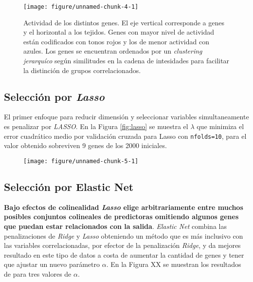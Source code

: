 \documentclass[a4paper]{article}\usepackage[]{graphicx}\usepackage[]{color}
\makeatletter
\def\maxwidth{ %
  \ifdim\Gin@nat@width>\linewidth
    \linewidth
  \else
    \Gin@nat@width
  \fi
}
\newenvironment{knitrout}{}{} %
\newcommand*{\torange}{\textcolor{BurntOrange}}
\makeatother
\begin{document}
\begin{figure}[H]
\begin{knitrout}
\color{fgcolor}

{\centering \texttt{[image: figure/unnamed-chunk-4-1]} 

}



\end{knitrout}

\caption{Actividad de los distintos genes. El eje vertical corresponde a genes y el horizontal a los tejidos. Genes con mayor nivel de actividad están codificados con tonos rojos y los de menor actividad con azules. Los genes se encuentran ordenados por un \textit{clustering jerarquíco} según similitudes en la cadena de intesidades para facilitar la distinción de grupos correlacionados.}
\label{fig:heatmap}
\end{figure}


\subsection{Selección por \textit{Lasso}}

El primer enfoque para reducir dimensión y seleccionar variables simultaneamente es penalizar por \textit{LASSO}. En la Figura \ref{fig:lasso} se muestra el $\lambda$ que minimiza el error cuadrático medio por validación cruzada para Lasso con \torange{\texttt{nfolds=10}}, para el valor obtenido sobreviven 9 genes de los 2000 iniciales. 


\begin{figure}[H]

\begin{knitrout}
\color{fgcolor}

{\centering \texttt{[image: figure/unnamed-chunk-5-1]} 

}



\end{knitrout}

\end{figure}

\clearpage

\subsection{Selección por Elastic Net}

\textbf{Bajo efectos de colinealidad \textit{Lasso} elige arbitrariamente entre muchos posibles conjuntos colineales de predictoras omitiendo algunos genes que puedan estar relacionados con la salida}. \textit{Elastic Net} combina las penalizaciones de \textit{Ridge} y \textit{Lasso} obteniendo un método que es más inclusivo con las variables correlacionadas, por efector de la penalización \textit{Ridge}, y da mejores resultado en este tipo de datos a costa de aumentar la cantidad de genes y tener que ajustar un nuevo parámetro $\alpha$. En la Figura XX se muestran los resultados de  para tres valores de $\alpha$.
\end{document}
